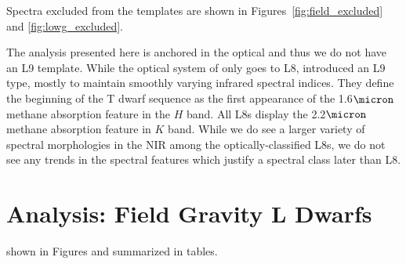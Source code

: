 \documentclass[12pt,preprint]{aastex}
\begin{document}
Spectra excluded from the templates are shown in Figures~\ref{fig:field_excluded} and \ref{fig:lowg_excluded}.


The analysis presented here is anchored in the optical and thus we do not have an L9 template.
While the optical system of \cite{K99} only goes to L8, \cite{Geballe02} introduced an L9 type, mostly to maintain smoothly varying infrared spectral indices.
They define the beginning of the T dwarf sequence as the first appearance of the 1.6$\micron$ methane absorption feature in the $H$ band.
All L8s display the 2.2$\micron$ methane absorption feature in $K$ band.
While we do see a larger variety of spectral morphologies in the NIR among the optically-classified L8s, we do not see any trends in the spectral features which justify a spectral class later than L8.



\clearpage
\section{Analysis: Field Gravity L Dwarfs}
\label{sec:fieldg}

shown in Figures and summarized in tables.

\end{document}
